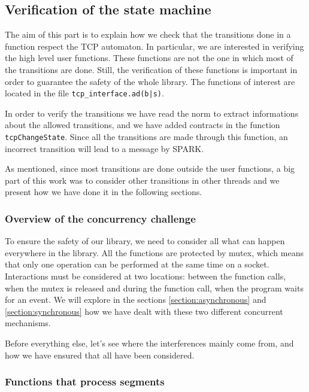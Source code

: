 \documentclass[a4paper, 10pt]{article}
\begin{document}
    \subsection{Verification of the state machine}

    The aim of this part is to explain how we check that the transitions done
    in a function respect the TCP automaton. In particular, we are interested in verifying
    the high level user functions. These functions are not the one in which most of the
    transitions are done. Still, the verification of these functions is important in order
    to guarantee the safety of the whole library. The functions of interest are located in
    the file \texttt{tcp\_interface.ad(b|s)}.

    In order to verify the transitions we have read the norm to extract informations about
    the allowed transitions, and we have added contracts in the function
    \lstinline[language=Ada]{tcpChangeState}. Since all the transitions are made through
    this function, an incorrect transition will lead to a message by SPARK.

    As mentioned, since most transitions are done outside the user functions, a big part
    of this work was to consider other transitions in other threads and we present how we have
    done it in the following sections.

    \subsubsection{Overview of the concurrency challenge}

    To ensure the safety of our library, we need to consider all what can happen everywhere in
    the library. All the functions are protected by mutex, which means that only one operation
    can be performed at the same time on a socket. Interactions must be considered at two
    locations: between the function calls, when the mutex is released and during the function
    call, when the program waits for an event. We will explore in the sections \ref{section:asynchronous}
    and \ref{section:synchronous} how we have dealt with these two different concurrent mechanisms.

    Before everything else, let's see where the interferences mainly come from, and how we have
    ensured that all have been considered.

    \subsubsection{Functions that process segments}
\end{document}
